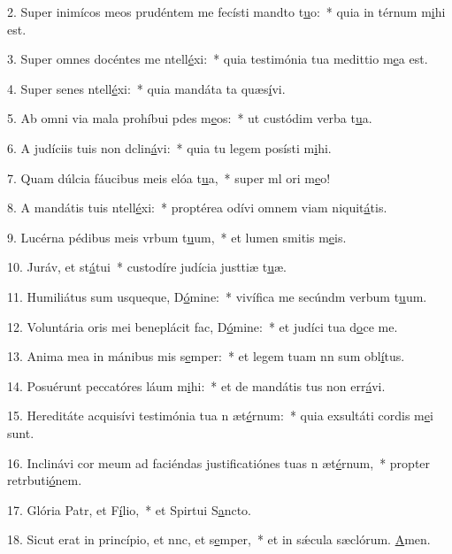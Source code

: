 2. Super inimícos meos prudéntem me fecísti mandto t\uline{u}o:~* quia in térnum m\uline{i}hi est.\par 
3. Super omnes docéntes me ntell\uline{é}xi:~* quia testimónia tua medittio m\uline{e}a est.\par 
4. Super senes ntell\uline{é}xi:~* quia mandáta ta quæs\uline{í}vi.\par 
5. Ab omni via mala prohíbui pdes m\uline{e}os:~* ut custódim verba t\uline{u}a.\par 
6. A judíciis tuis non dclin\uline{á}vi:~* quia tu legem posísti m\uline{i}hi.\par 
7. Quam dúlcia fáucibus meis elóa t\uline{u}a,~* super ml ori m\uline{e}o!\par 
8. A mandátis tuis ntell\uline{é}xi:~* proptérea odívi omnem viam niquit\uline{á}tis.\par 
9. Lucérna pédibus meis vrbum t\uline{u}um,~* et lumen smitis m\uline{e}is.\par 
10. Juráv, et st\uline{á}tui~* custodíre judícia justtiæ t\uline{u}æ.\par 
11. Humiliátus sum usqueque, D\uline{ó}mine:~* vivífica me secúndm verbum t\uline{u}um.\par 
12. Voluntária oris mei beneplácit fac, D\uline{ó}mine:~* et judíci tua d\uline{o}ce me.\par 
13. Anima mea in mánibus mis s\uline{e}mper:~* et legem tuam nn sum obl\uline{í}tus.\par 
14. Posuérunt peccatóres láum m\uline{i}hi:~* et de mandátis tus non err\uline{á}vi.\par 
15. Hereditáte acquisívi testimónia tua n æt\uline{é}rnum:~* quia exsultáti cordis m\uline{e}i sunt.\par 
16. Inclinávi cor meum ad faciéndas justificatiónes tuas n æt\uline{é}rnum,~* propter retrbuti\uline{ó}nem.\par 
17. Glória Patr, et F\uline{í}lio,~* et Spirtui S\uline{a}ncto.\par 
18. Sicut erat in princípio, et nnc, et s\uline{e}mper,~* et in sǽcula sæclórum. \uline{A}men.\par 
